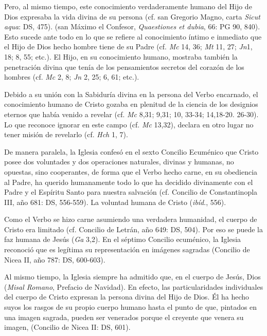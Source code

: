 	 Pero, al mismo tiempo, este conocimiento verdaderamente humano del Hijo de Dios expresaba la vida divina de su persona (cf. san Gregorio Magno, carta \emph{Sicut aqua}: DS, 475).  (san Máximo el Confesor, \emph{Quaestiones et dubia}, 66: PG 90, 840). Esto sucede ante todo en lo que se refiere al conocimiento íntimo e inmediato que el Hijo de Dios hecho hombre tiene de su Padre (cf. \emph{Mc} 14, 36; \emph{Mt} 11, 27; \emph{Jn}1, 18; 8, 55; etc.). El Hijo, en su conocimiento humano, mostraba también la penetración divina que tenía de los pensamientos secretos del corazón de los hombres (cf. \emph{Mc} 2, 8; \emph{Jn} 2, 25; 6, 61; etc.).
	
	 Debido a su unión con la Sabiduría divina en la persona del Verbo encarnado, el conocimiento humano de Cristo gozaba en plenitud de la ciencia de los designios eternos que había venido a revelar (cf. \emph{Mc} 8,31; 9,31; 10, 33-34; 14,18-20. 26-30). Lo que reconoce ignorar en este campo (cf. \emph{Mc} 13,32), declara en otro lugar no tener misión de revelarlo (cf. \emph{Hch} 1, 7).
	
	 De manera paralela, la Iglesia confesó en el sexto Concilio Ecuménico que Cristo posee dos voluntades y dos operaciones naturales, divinas y humanas, no opuestas, sino cooperantes, de forma que el Verbo hecho carne, en su obediencia al Padre, ha querido humanamente todo lo que ha decidido divinamente con el Padre y el Espíritu Santo para nuestra salvación (cf. Concilio de Constantinopla III, año 681: DS, 556-559). La voluntad humana de Cristo  (\emph{ibíd}., 556).
	
	 Como el Verbo se hizo carne asumiendo una verdadera humanidad, el cuerpo de Cristo era limitado (cf. Concilio de Letrán, año 649: DS, 504). Por eso se puede  la faz humana de Jesús (\emph{Ga} 3,2). En el séptimo Concilio ecuménico, la Iglesia reconoció que es legítima su representación en imágenes sagradas (Concilio de Nicea II, año 787: DS, 600-603).
	
	 Al mismo tiempo, la Iglesia siempre ha admitido que, en el cuerpo de Jesús, Dios  (\emph{Misal Romano}, Prefacio de Navidad). En efecto, las particularidades individuales del cuerpo de Cristo expresan la persona divina del Hijo de Dios. Él ha hecho suyos los rasgos de su propio cuerpo humano hasta el punto de que, pintados en una imagen sagrada, pueden ser venerados porque el creyente que venera su imagen,  (Concilio de Nicea II: DS, 601).
	
